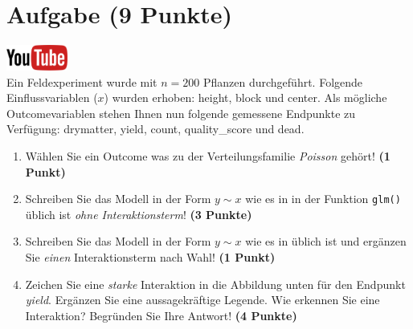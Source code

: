 \documentclass[a4paper, 9pt]{scrartcl}\usepackage[]{graphicx}\usepackage[]{xcolor}
\begin{document}
\section{Aufgabe \hfill (9 Punkte)}

\hfill\href{https://youtu.be/AwQEcQWLFCw}{\includegraphics[width =
  2cm]{img/youtube}}\\[1Ex]



Ein Feldexperiment wurde mit $n = 200$ Pflanzen durchgef{\"u}hrt. Folgende
Einflussvariablen ($x$) wurden erhoben: height, block und center. Als m{\"o}gliche Outcomevariablen stehen Ihnen nun
folgende gemessene Endpunkte zu Verf{\"u}gung: drymatter, yield, count, quality\_score und dead.

\begin{enumerate}
\item W{\"a}hlen Sie ein Outcome was zu der Verteilungsfamilie
  \textit{Poisson} geh{\"o}rt! \textbf{(1 Punkt)}
\item Schreiben Sie das Modell in der Form $y \sim x$ wie es in \Rlogo in
  der Funktion \texttt{glm()}
  {\"u}blich ist \textit{ohne Interaktionsterm}! \textbf{(3 Punkte)}
\item Schreiben Sie das Modell in der Form $y \sim x$ wie es in \Rlogo
  {\"u}blich ist und erg{\"a}nzen Sie \textit{einen} Interaktionsterm nach Wahl! \textbf{(1 Punkt)} 
\item Zeichen Sie eine \textit{starke}
  Interaktion in die Abbildung unten f{\"u}r den Endpunkt
  \textit{yield}. Erg{\"a}nzen Sie eine aussagekr{\"a}ftige Legende. Wie erkennen
  Sie eine Interaktion? Begr{\"u}nden Sie Ihre Antwort! \textbf{(4 Punkte)}
\end{enumerate}
\end{document}
